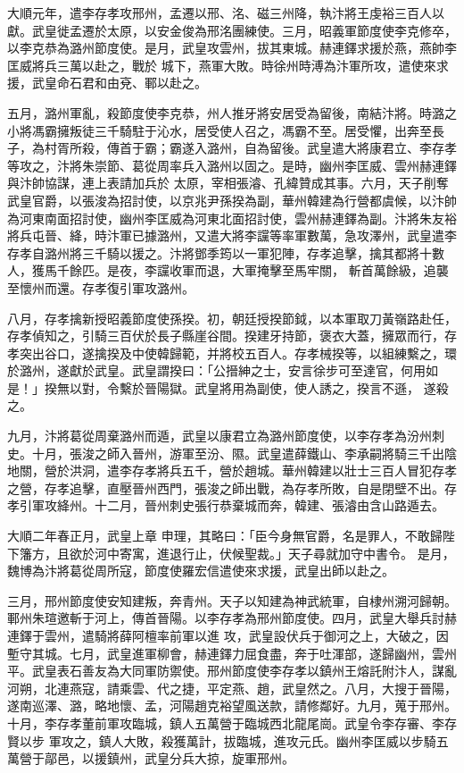 \begin{pinyinscope}
 大順元年，遣李存孝攻邢州，孟遷以邢、洺、磁三州降，執汴將王虔裕三百人以獻。武皇徙孟遷於太原，以安金俊為邢洺團練使。三月，昭義軍節度使李克修卒，以李克恭為潞州節度使。是月，武皇攻雲州，拔其東城。赫連鐸求援於燕，燕帥李匡威將兵三萬以赴之，戰於
 城下，燕軍大敗。時徐州時溥為汴軍所攻，遣使來求援，武皇命石君和由兗、鄆以赴之。



 五月，潞州軍亂，殺節度使李克恭，州人推牙將安居受為留後，南結汴將。時潞之小將馮霸擁叛徒三千騎駐于沁水，居受使人召之，馮霸不至。居受懼，出奔至長子，為村胥所殺，傳首于霸；霸遂入潞州，自為留後。武皇遣大將康君立、李存孝等攻之，汴將朱崇節、葛從周率兵入潞州以固之。是時，幽州李匡威、雲州赫連鐸與汴帥協謀，連上表請加兵於
 太原，宰相張濬、孔緯贊成其事。六月，天子削奪武皇官爵，以張浚為招討使，以京兆尹孫揆為副，華州韓建為行營都虞候，以汴帥為河東南面招討使，幽州李匡威為河東北面招討使，雲州赫連鐸為副。汴將朱友裕將兵屯晉、絳，時汴軍已據潞州，又遣大將李讜等率軍數萬，急攻澤州，武皇遣李存孝自潞州將三千騎以援之。汴將鄧季筠以一軍犯陣，存孝追擊，擒其都將十數人，獲馬千餘匹。是夜，李讜收軍而退，大軍掩擊至馬牢關，
 斬首萬餘級，追襲至懷州而還。存孝復引軍攻潞州。



 八月，存孝擒新授昭義節度使孫揆。初，朝廷授揆節鉞，以本軍取刀黃嶺路赴任，存孝偵知之，引騎三百伏於長子縣崖谷間。揆建牙持節，褒衣大蓋，擁眾而行，存孝突出谷口，遂擒揆及中使韓歸範，并將校五百人。存孝械揆等，以組練繫之，環於潞州，遂獻於武皇。武皇謂揆曰：「公搢紳之士，安言徐步可至達官，何用如是！」揆無以對，令繫於晉陽獄。武皇將用為副使，使人誘之，揆言不遜，
 遂殺之。



 九月，汴將葛從周棄潞州而遁，武皇以康君立為潞州節度使，以李存孝為汾州刺史。十月，張浚之師入晉州，游軍至汾、隰。武皇遣薛鐵山、李承嗣將騎三千出陰地關，營於洪洞，遣李存孝將兵五千，營於趙城。華州韓建以壯士三百人冒犯存孝之營，存孝追擊，直壓晉州西門，張浚之師出戰，為存孝所敗，自是閉壁不出。存孝引軍攻絳州。十二月，晉州刺史張行恭棄城而奔，韓建、張濬由含山路遁去。


大順二年春正月，武皇上章
 申理，其略曰：「臣今身無官爵，名是罪人，不敢歸陛下籓方，且欲於河中寄寓，進退行止，伏候聖裁。」天子尋就加守中書令。
 是月，魏博為汴將葛從周所寇，節度使羅宏信遣使來求援，武皇出師以赴之。



 三月，邢州節度使安知建叛，奔青州。天子以知建為神武統軍，自棣州溯河歸朝。鄆州朱瑄邀斬于河上，傳首晉陽。以李存孝為邢州節度使。四月，武皇大舉兵討赫連鐸于雲州，遣騎將薛阿檀率前軍以進
 攻，武皇設伏兵于御河之上，大破之，因塹守其城。七月，武皇進軍柳會，赫連鐸力屈食盡，奔于吐渾部，遂歸幽州，雲州平。武皇表石善友為大同軍防禦使。邢州節度使李存孝以鎮州王熔託附汴人，謀亂河朔，北連燕寇，請乘雲、代之捷，平定燕、趙，武皇然之。八月，大搜于晉陽，遂南巡澤、潞，略地懷、孟，河陽趙克裕望風送款，請修鄰好。九月，蒐于邢州。十月，李存孝董前軍攻臨城，鎮人五萬營于臨城西北龍尾崗。武皇令李存審、李存賢以步
 軍攻之，鎮人大敗，殺獲萬計，拔臨城，進攻元氏。幽州李匡威以步騎五萬營于鄗邑，以援鎮州，武皇分兵大掠，旋軍邢州。



\end{pinyinscope}